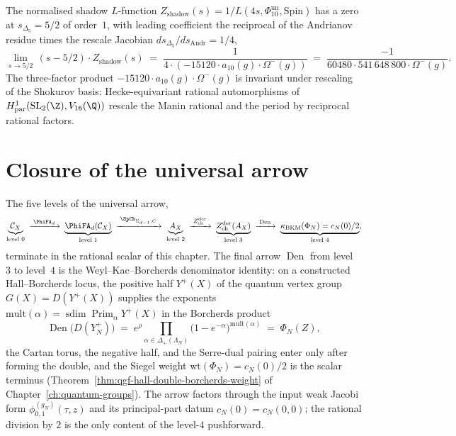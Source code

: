 \begin{remark}
\label{rem:terminus-shadow-z-5-2}
The normalised shadow $L$-function $Z_{\mathrm{shadow}}(s) =
1/L(4 s, \Phi_{10}^{\mathrm{un}}, \mathrm{Spin})$ has a zero at
$s_{\Delta_5} = 5/2$ of order~$1$, with leading coefficient
the reciprocal of the Andrianov residue times the rescale Jacobian
$ds_{\Delta_5}/ds_{\mathrm{Andr}} = 1/4$,
\[
 \lim_{s \to 5/2}\, (s - 5/2) \cdot Z_{\mathrm{shadow}}(s) \;=\;
 \frac{1}{4 \cdot (-15120 \cdot a_{10}(g) \cdot \Omega^-(g))} \;=\;
 \frac{-1}{60480 \cdot 541\,648\,800 \cdot \Omega^-(g)}.
\]
The three-factor product $-15120 \cdot a_{10}(g) \cdot \Omega^-(g)$
is invariant under rescaling of the Shokurov basis: Hecke-equivariant
rational automorphisms of $H^1_{\mathrm{par}}(\mathrm{SL}_2(\Z),
V_{16}(\Q))$ rescale the Manin rational and the period by reciprocal
rational factors.
\end{remark}

\section{Closure of the universal arrow}
\label{sec:terminus-closure}

The five levels of the universal arrow,
\[
 \underbrace{\mathcal C_X}_{\text{level } 0} \;\xrightarrow{\;\PhiFA_d\;}\;
 \underbrace{\PhiFA_d(\mathcal C_X)}_{\text{level } 1}
 \;\xrightarrow{\;\SpCh_{\Sigma_{d-1}, C}\;}\;
 \underbrace{A_X}_{\text{level } 2}
 \;\xrightarrow{\;Z^{\mathrm{der}}_{\mathrm{ch}}\;}\;
 \underbrace{Z^{\mathrm{der}}_{\mathrm{ch}}(A_X)}_{\text{level } 3}
 \;\xrightarrow{\;\operatorname{Den}\;}\;
 \underbrace{\kappa_{\mathrm{BKM}}(\Phi_N) = c_N(0)/2}_{\text{level } 4},
\]
terminate in the rational scalar of this chapter.  The final arrow
$\operatorname{Den}$ from level~$3$ to level~$4$ is the Weyl--Kac--Borcherds
denominator identity: on a constructed Hall--Borcherds locus, the
positive half \(Y^+(X)\) of the quantum vertex group
\(G(X)=D(Y^+(X))\) supplies the exponents
$\mathrm{mult}(\alpha) = \operatorname{sdim}\operatorname{Prim}_\alpha
Y^+(X)$ in the Borcherds product
\[
 \operatorname{Den}\bigl(D(Y^+_N)\bigr)
 \;=\; e^\rho \prod_{\alpha \in \Delta_+(\Lambda_N)}
 \bigl(1 - e^{-\alpha}\bigr)^{\mathrm{mult}(\alpha)}
 \;=\; \Phi_N(Z),
\]
the Cartan torus, the negative half, and the Serre-dual pairing
enter only after forming the double, and the Siegel weight
$\mathrm{wt}(\Phi_N) = c_N(0)/2$ is the scalar terminus
(Theorem~\ref{thm:qgf-hall-double-borcherds-weight} of
Chapter~\ref{ch:quantum-groups}).
The arrow factors through the input weak Jacobi form
$\phi_{0, 1}^{(g_N)}(\tau, z)$ and its principal-part datum
$c_N(0) = c_N(0, 0)$; the rational division by $2$ is the only
content of the level-$4$ pushforward.

